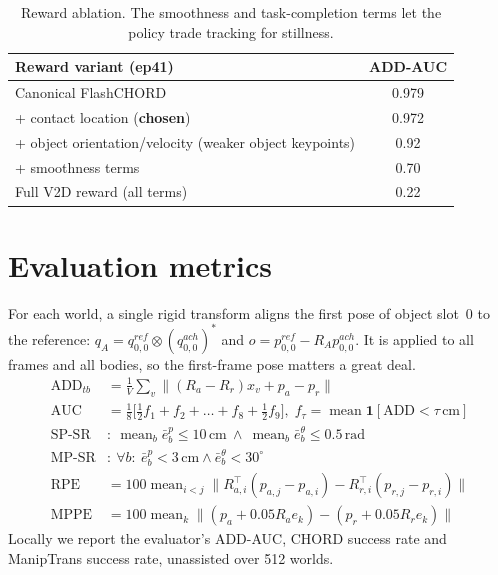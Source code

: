 \documentclass[10pt,a4paper]{article}
\begin{document}
\begin{table}[!htb]
\centering\small
\begin{tabular}{lc}
\toprule
Reward variant (ep41) & ADD-AUC \\
\midrule
Canonical FlashCHORD & 0.979 \\
+ contact location (\textbf{chosen}) & 0.972 \\
+ object orientation/velocity (weaker object keypoints) & 0.92 \\
+ smoothness terms & 0.70 \\
Full V2D reward (all terms) & 0.22 \\
\bottomrule
\end{tabular}
\caption{Reward ablation. The smoothness and task-completion terms let the policy trade tracking for stillness.}
\label{tab:abl}
\end{table}

\section{Evaluation metrics}
\label{sec:metrics}
For each world, a single rigid transform aligns the first pose of object slot~0 to the reference: $q_A=q^{ref}_{0,0}\otimes(q^{ach}_{0,0})^*$ and
$o=p^{ref}_{0,0}-R_Ap^{ach}_{0,0}$. It is applied to all frames and all bodies, so the first-frame pose matters a great deal.
\begin{align}
\mathrm{ADD}_{tb}&=\tfrac1V\textstyle\sum_v\|(R_a-R_r)x_v+p_a-p_r\|\\
\mathrm{AUC}&=\tfrac18\big[\tfrac12f_1+f_2+\dots+f_8+\tfrac12f_9\big],\; f_\tau=\operatorname{mean}\mathbf 1[\mathrm{ADD}<\tau\,\mathrm{cm}]\\
\text{SP-SR}&:\ \operatorname{mean}_b\bar e^p_b\le10\,\text{cm}\ \wedge\ \operatorname{mean}_b\bar e^\theta_b\le0.5\,\text{rad}\\
\text{MP-SR}&:\ \forall b:\ \bar e^p_b<3\,\text{cm}\wedge\bar e^\theta_b<30^\circ\\
\mathrm{RPE}&=100\operatorname{mean}_{i<j}\big\|R_{a,i}^\top(p_{a,j}-p_{a,i})-R_{r,i}^\top(p_{r,j}-p_{r,i})\big\|\\
\mathrm{MPPE}&=100\operatorname{mean}_k\|(p_a+0.05R_ae_k)-(p_r+0.05R_re_k)\|
\end{align}
Locally we report the evaluator's ADD-AUC, CHORD success rate and ManipTrans success rate, unassisted over 512 worlds.

\end{document}
